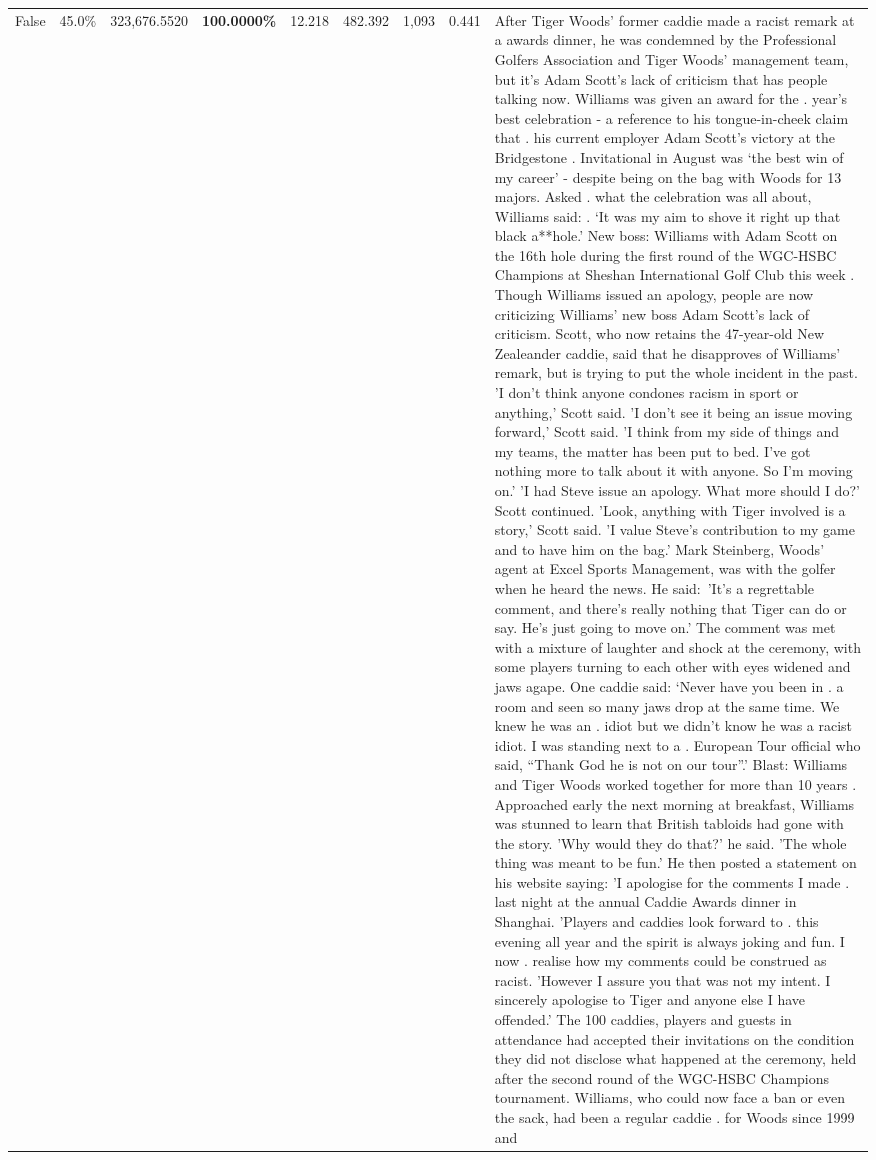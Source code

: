\begin{table}[H]
\begin{tabular}{lllrlllll}
False & 45.0\% & 323,676.5520 & \bfseries \color{red} 100.0000\% & 12.218 & 482.392 & 1,093 & 0.441 & After Tiger Woods' former caddie made a racist remark at a awards dinner, he was condemned by the Professional Golfers Association and Tiger Woods' management team, but it's Adam Scott's lack of criticism that has people talking now. Williams was given an award for the . year’s best celebration - a reference to his tongue-in-cheek claim that . his current employer Adam Scott’s victory at the Bridgestone . Invitational in August was ‘the best win of my career’ - despite being on the bag with Woods for 13 majors. Asked . what the celebration was all about, Williams said: . ‘It was my aim to shove it right up that black a**hole.’ New boss: Williams with Adam Scott  on the 16th hole during the first round of the WGC-HSBC Champions at Sheshan International Golf Club this week . Though Williams issued an apology, people are now criticizing Williams' new boss Adam Scott's lack of criticism. Scott, who now retains the 47-year-old New Zealeander caddie, said that he disapproves of Williams' remark, but is trying to put the whole incident in the past. 'I don't think anyone condones racism in sport or anything,' Scott said. 'I don't see it being an issue moving forward,' Scott said. 'I think from my side of things and my teams, the matter has been put to bed. I've got nothing more to talk about it with anyone. So I'm moving on.' 'I had Steve issue an apology. What more should I do?' Scott continued. 'Look, anything with Tiger involved is a story,' Scott said. 'I value Steve's contribution to my game and to have him on the bag.' Mark Steinberg, Woods' agent at Excel Sports Management, was with the golfer when he heard the news. He said: 'It's a regrettable comment, and there's really nothing that Tiger can do or say. He's just going to move on.' The comment was met with a mixture of laughter and shock at the ceremony, with some players turning to each other with eyes widened and jaws agape. One caddie said: ‘Never have you been in . a room and seen so many jaws drop at the same time. We knew he was an . idiot but we didn’t know he was a racist idiot. I was standing next to a . European Tour official who said, “Thank God he is not on our tour”.’ Blast: Williams and Tiger Woods worked together for more than 10 years . Approached early the next morning at breakfast, Williams was stunned to learn that British tabloids had gone with the story. 'Why would they do that?' he said. 'The whole thing was meant to be fun.' He then posted a statement on his website saying: 'I apologise for the comments I made . last night at the annual Caddie Awards dinner in Shanghai. 'Players and caddies look forward to . this evening all year and the spirit is always joking and fun. I now . realise how my comments could be construed as racist. 'However I assure you that was not my intent. I sincerely apologise to Tiger and anyone else I have offended.' The 100 caddies, players and guests in attendance had accepted their invitations on the condition they did not disclose what happened at the ceremony, held after the second round of the WGC-HSBC Champions tournament. Williams, who could now face a ban or even the sack, had been a regular caddie . for Woods since 1999 and 
\end{tabular}
\end{table}
